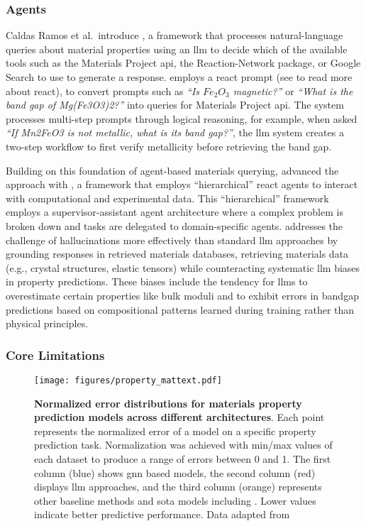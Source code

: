 \subsubsection{Agents}

Caldas Ramos et al.\ introduce , a framework that processes natural-language queries about material properties using an \gls{llm} to decide which of the available tools such as the Materials Project \gls{api}, the Reaction-Network package, or Google Search to use to generate a response. \autocite{Jablonka2023}  employs a \gls{react} prompt (see  to read more about \gls{react}), to convert prompts such as  \textit{\enquote{Is $Fe_2O_3$ magnetic?}} or \textit{\enquote{What is the band gap of Mg(Fe3O3)2?}} into queries for Materials Project \gls{api}. 
The system processes multi-step prompts through logical reasoning, for example, when asked \textit{\enquote{If Mn2FeO3 is not metallic, what is its band gap?}}, the \gls{llm} system creates a two-step workflow to first verify metallicity before retrieving the band gap.

Building on this foundation of agent-based materials querying, \textcite{chiang2024llamp} advanced the approach with , a framework that employs \enquote{hierarchical} \gls{react} agents to interact with computational and experimental data. This \enquote{hierarchical} framework employs a supervisor-assistant agent architecture where a complex problem is broken down and tasks are delegated to domain-specific agents.   addresses the challenge of hallucinations more effectively than standard \gls{llm} approaches by grounding responses in retrieved materials databases, retrieving materials data (e.g., crystal structures, elastic tensors) while counteracting systematic \gls{llm} biases in property predictions. These biases include the tendency for \glspl{llm} to overestimate certain properties like bulk moduli and to exhibit errors in bandgap predictions based on compositional patterns learned during training rather than physical principles.


\subsubsection{Core Limitations}\label{sec:property_core_limits}

\begin{figure}[htb]
    \centering
    \texttt{[image: figures/property\_mattext.pdf]}
    \caption{\textbf{Normalized error distributions for materials property prediction models across different architectures}. Each point represents the normalized error of a model on a specific property prediction task. Normalization was achieved with min/max values of each dataset to produce a range of errors between 0 and 1. The first column (blue) shows \gls{gnn} based models, the second column (red) displays \gls{llm} approaches, and the third column (orange) represents other baseline methods and \gls{sota} models including . \autocite{Wang_2021} Lower values indicate better predictive performance. Data adapted from \textcite{alampara2024mattext}}
    \label{fig:property_limitations}
\end{figure}

